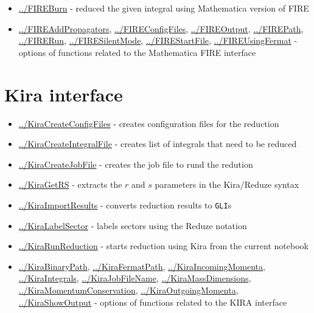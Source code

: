 \documentclass[../FeynHelpersManual.tex]{subfiles}
\begin{document}
\begin{itemize}
\tightlist
\item
  \hyperlink{../fireburn}{../FIREBurn} - reduced the given integral
  using Mathematica version of FIRE
\item
  \hyperlink{../fireaddpropagators}{../FIREAddPropagators},
  \hyperlink{../fireconfigfiles}{../FIREConfigFiles},
  \hyperlink{../fireoutput}{../FIREOutput},
  \hyperlink{../firepath}{../FIREPath},
  \hyperlink{../firerun}{../FIRERun},
  \hyperlink{../firesilentmode}{../FIRESilentMode},
  \hyperlink{../firestartfile}{../FIREStartFile},
  \hyperlink{../fireusingfermat}{../FIREUsingFermat} - options of
  functions related to the Mathematica FIRE interface
\end{itemize}

\hypertarget{kira interface}{
\section{Kira interface}\label{kira interface}}

\begin{itemize}
\tightlist
\item
  \hyperlink{../kiracreateconfigfiles}{../KiraCreateConfigFiles} -
  creates configuration files for the reduction
\item
  \hyperlink{../kiracreateintegralfile}{../KiraCreateIntegralFile} -
  creates list of integrals that need to be reduced
\item
  \hyperlink{../kiracreatejobfile}{../KiraCreateJobFile} - creates the
  job file to rund the redution
\item
  \hyperlink{../kiragetrs}{../KiraGetRS} - extracts the \(r\) and \(s\)
  parameters in the Kira/Reduze syntax
\item
  \hyperlink{../kiraimportresults}{../KiraImportResults} - converts
  reduction results to \texttt{GLI}s
\item
  \hyperlink{../kiralabelsector}{../KiraLabelSector} - labels sectors
  using the Reduze notation
\item
  \hyperlink{../kirarunreduction}{../KiraRunReduction} - starts
  reduction using Kira from the current notebook
\item
  \hyperlink{../kirabinarypath}{../KiraBinaryPath},
  \hyperlink{../kirafermatpath}{../KiraFermatPath},
  \hyperlink{../kiraincomingmomenta}{../KiraIncomingMomenta},
  \hyperlink{../kiraintegrals}{../KiraIntegrals},
  \hyperlink{../kirajobfilename}{../KiraJobFileName},
  \hyperlink{../kiramassdimensions}{../KiraMassDimensions},
  \hyperlink{../kiramomentumconservation}{../KiraMomentumConservation},
  \hyperlink{../kiraoutgoingmomenta}{../KiraOutgoingMomenta},
  \hyperlink{../kirashowoutput}{../KiraShowOutput} - options of
  functions related to the KIRA interface
\end{itemize}
\end{document}
